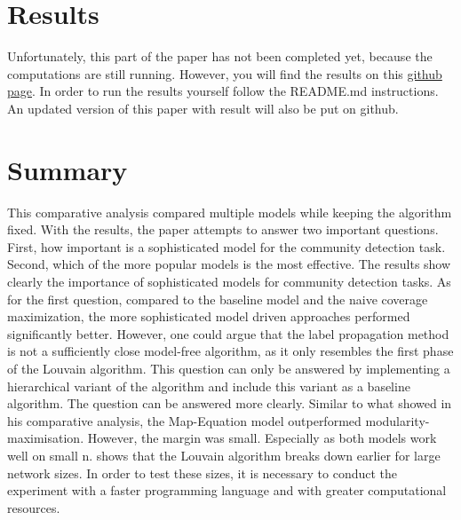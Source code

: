 \documentclass[11pt, twocolumn]{article}
\begin{document}
\section{Results}
{\color{red} Unfortunately, this part of the paper has not been completed yet, because the computations are still running. However, you will find the results on this \href{https://github.com/fallback2993/network_science}{github page}. In order to run the results yourself follow the README.md instructions. An updated version of this paper with result will also be put on github. }

\section{Summary}
This comparative analysis compared multiple models while keeping the algorithm fixed. With the results, the paper attempts to answer two important questions. First, how important is a sophisticated model for the community detection task. Second, which of the more popular models is the most effective.
The results show clearly the importance of sophisticated models for community detection tasks. As for the first question, compared to the baseline model and the naive coverage maximization, the more sophisticated model driven approaches performed significantly better. However, one could argue that the label propagation method is not a sufficiently close model-free algorithm, as it only resembles the first phase of the Louvain algorithm. This question can only be answered by implementing a hierarchical variant of the algorithm and include this variant as a baseline algorithm. The question can be answered more clearly. Similar to what \cite{lancichinetti_CommunityDetectionAlgorithms_2009} showed in his comparative analysis, the Map-Equation model outperformed modularity-maximisation. However, the margin was small. Especially as both models work well on small n. \citeauthor{lancichinetti_CommunityDetectionAlgorithms_2009} shows that the Louvain algorithm breaks down earlier for large network sizes. In order to test these sizes, it is necessary to conduct the experiment with a faster programming language and with greater computational resources.  


\end{document}
